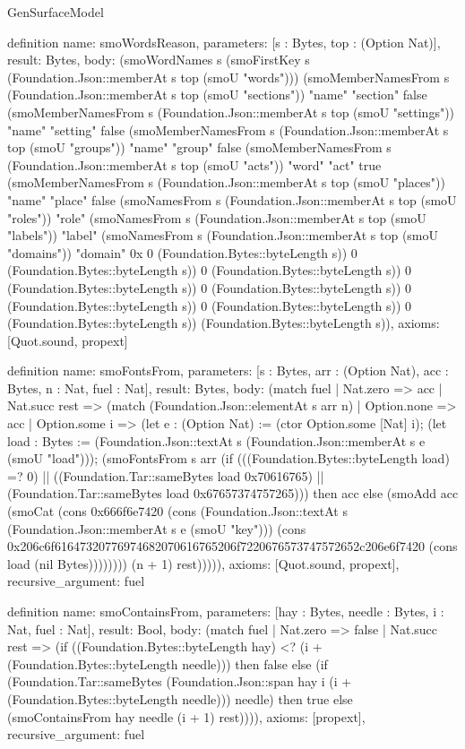 \begin{lexlean}{GenSurfaceModel}
\begin{semanticmodule}
definition{
  name: smoWordsReason,
  parameters: [s : Bytes, top : (Option Nat)],
  result: Bytes,
  body: (smoWordNames s (smoFirstKey s (Foundation.Json::memberAt s top (smoU "words"))) (smoMemberNamesFrom s (Foundation.Json::memberAt s top (smoU "sections")) "name" "section" false (smoMemberNamesFrom s (Foundation.Json::memberAt s top (smoU "settings")) "name" "setting" false (smoMemberNamesFrom s (Foundation.Json::memberAt s top (smoU "groups")) "name" "group" false (smoMemberNamesFrom s (Foundation.Json::memberAt s top (smoU "acts")) "word" "act" true (smoMemberNamesFrom s (Foundation.Json::memberAt s top (smoU "places")) "name" "place" false (smoNamesFrom s (Foundation.Json::memberAt s top (smoU "roles")) "role" (smoNamesFrom s (Foundation.Json::memberAt s top (smoU "labels")) "label" (smoNamesFrom s (Foundation.Json::memberAt s top (smoU "domains")) "domain" 0x 0 (Foundation.Bytes::byteLength s)) 0 (Foundation.Bytes::byteLength s)) 0 (Foundation.Bytes::byteLength s)) 0 (Foundation.Bytes::byteLength s)) 0 (Foundation.Bytes::byteLength s)) 0 (Foundation.Bytes::byteLength s)) 0 (Foundation.Bytes::byteLength s)) 0 (Foundation.Bytes::byteLength s)) (Foundation.Bytes::byteLength s)),
  axioms: [Quot.sound, propext]
}

definition{
  name: smoFontsFrom,
  parameters: [s : Bytes, arr : (Option Nat), acc : Bytes, n : Nat, fuel : Nat],
  result: Bytes,
  body: (match fuel
    | Nat.zero => acc
    | Nat.succ rest => (match (Foundation.Json::elementAt s arr n)
      | Option.none => acc
      | Option.some i => (let e : (Option Nat) := (ctor Option.some [Nat] i); (let load : Bytes := (Foundation.Json::textAt s (Foundation.Json::memberAt s e (smoU "load"))); (smoFontsFrom s arr (if (((Foundation.Bytes::byteLength load) =? 0) || ((Foundation.Tar::sameBytes load 0x70616765) || (Foundation.Tar::sameBytes load 0x67657374757265))) then acc else (smoAdd acc (smoCat (cons 0x666f6e7420 (cons (Foundation.Json::textAt s (Foundation.Json::memberAt s e (smoU "key"))) (cons 0x206c6f61647320776974682070616765206f7220676573747572652c206e6f7420 (cons load (nil Bytes)))))))) (n + 1) rest))))),
  axioms: [Quot.sound, propext],
  recursive_argument: fuel
}

definition{
  name: smoContainsFrom,
  parameters: [hay : Bytes, needle : Bytes, i : Nat, fuel : Nat],
  result: Bool,
  body: (match fuel
    | Nat.zero => false
    | Nat.succ rest => (if ((Foundation.Bytes::byteLength hay) <? (i + (Foundation.Bytes::byteLength needle))) then false else (if (Foundation.Tar::sameBytes (Foundation.Json::span hay i (i + (Foundation.Bytes::byteLength needle))) needle) then true else (smoContainsFrom hay needle (i + 1) rest)))),
  axioms: [propext],
  recursive_argument: fuel
}


\end{semanticmodule}
\end{lexlean}
